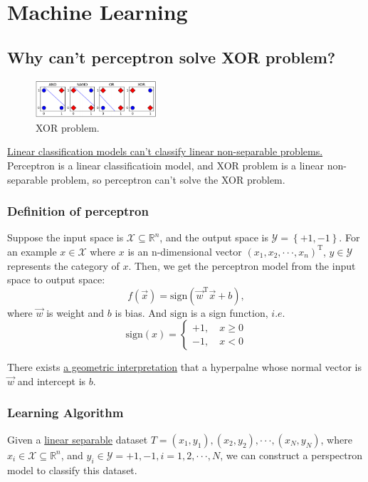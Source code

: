 \documentclass[10pt,onecolumn]{book}
\begin{document}
\chapter{Machine Learning}

\section{Why can't perceptron solve XOR problem?}
\begin{figure}[h]
\centering
\includegraphics[width=0.4\textwidth]{figures/XOR_problem.png}
\caption{XOR problem.}
\end{figure}
 \uline{Linear classification models can't classify linear non-separable problems.} Perceptron is a linear classificatioin model, and XOR problem is a linear non-separable problem, so perceptron can't solve the XOR problem.

\subsection{Definition of perceptron}
Suppose the input space is $\mathcal{X} \subseteq \mathbb{R}^n$, and the output space is $\mathcal{Y} = \left\{+1, -1\right\}$. For an example $x \in \mathcal{X}$ where $x$ is an n-dimensional vector $(x_{1}, x_{2}, \cdot \cdot \cdot, x_{n})^\mathrm{T}$, $y \in \mathcal{Y}$ represents the category of $x$. Then, we get the perceptron model from the input space to output space: 
\begin{equation}
f(\vec{x}) = \mathrm{sign}(\vec{w}^\mathrm{T} \vec{x} + b),
\end{equation}
where $\vec{w}$ is weight and $b$ is bias. And $\mathrm{sign}$ is a sign function, $i. e.$
\begin{equation}
\mathrm{sign}(x)=
\left\{
	\begin{array}{ll}
		+1, \quad x \ge 0  \\
		-1, \quad x < 0
	\end{array}
\right.
\end{equation}

There exists \uline{a geometric interpretation} that a hyperpalne whose normal vector is $\vec{w}$ and intercept is $b$.

\subsection{Learning Algorithm}
Given a \uline{linear separable} dataset $T = {(x_{1}, y_{1}), (x_{2}, y_{2}), \cdot \cdot \cdot, (x_{N}, y_{N})}$, where $x_{i} \in \mathcal{X} \subseteq \mathbb{R}^n$, and $y_{i} \in \mathcal{Y} = {+1, -1}, i = 1, 2, \cdot \cdot \cdot, N$, we can construct a perspectron model to classify this dataset. 
\end{document}
